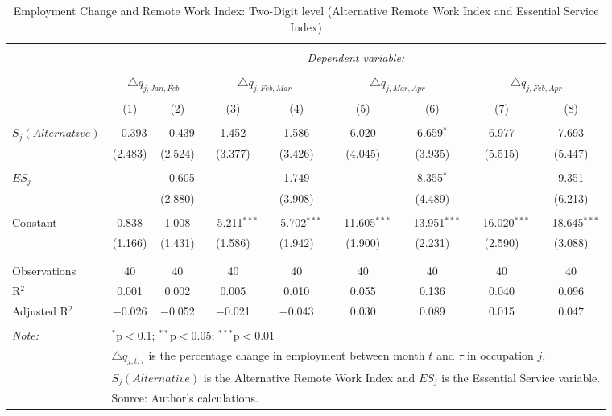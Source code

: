 
\begin{table}[!htbp] \centering 
  \caption{Employment Change and Remote Work Index: Two-Digit level (Alternative Remote Work Index and Essential Service Index)} 
  \label{tab:regression_dynamics_2digit_alternative_robustness_essential_service} 
\footnotesize 
\begin{tabular}{@{\extracolsep{5pt}}lcccccccc} 
\\[-1.8ex]\hline 
\hline \\[-1.8ex] 
 & \multicolumn{8}{c}{\textit{Dependent variable:}} \\ 
\cline{2-9} 
\\[-1.8ex] & \multicolumn{2}{c}{$\triangle q_{j,Jan,Feb}$} & \multicolumn{2}{c}{$\triangle q_{j,Feb,Mar}$} & \multicolumn{2}{c}{$\triangle q_{j,Mar,Apr}$} & \multicolumn{2}{c}{$\triangle q_{j,Feb,Apr}$} \\ 
\\[-1.8ex] & (1) & (2) & (3) & (4) & (5) & (6) & (7) & (8)\\ 
\hline \\[-1.8ex] 
 $S_{j} (Alternative)$ & $-$0.393 & $-$0.439 & 1.452 & 1.586 & 6.020 & 6.659$^{*}$ & 6.977 & 7.693 \\ 
  & (2.483) & (2.524) & (3.377) & (3.426) & (4.045) & (3.935) & (5.515) & (5.447) \\ 
  & & & & & & & & \\ 
 $ES_{j}$ &  & $-$0.605 &  & 1.749 &  & 8.355$^{*}$ &  & 9.351 \\ 
  &  & (2.880) &  & (3.908) &  & (4.489) &  & (6.213) \\ 
  & & & & & & & & \\ 
 Constant & 0.838 & 1.008 & $-$5.211$^{***}$ & $-$5.702$^{***}$ & $-$11.605$^{***}$ & $-$13.951$^{***}$ & $-$16.020$^{***}$ & $-$18.645$^{***}$ \\ 
  & (1.166) & (1.431) & (1.586) & (1.942) & (1.900) & (2.231) & (2.590) & (3.088) \\ 
  & & & & & & & & \\ 
\hline \\[-1.8ex] 
Observations & 40 & 40 & 40 & 40 & 40 & 40 & 40 & 40 \\ 
R$^{2}$ & 0.001 & 0.002 & 0.005 & 0.010 & 0.055 & 0.136 & 0.040 & 0.096 \\ 
Adjusted R$^{2}$ & $-$0.026 & $-$0.052 & $-$0.021 & $-$0.043 & 0.030 & 0.089 & 0.015 & 0.047 \\ 
\hline 
\hline \\[-1.8ex] 
\textit{Note:}  & \multicolumn{8}{l}{$^{*}$p$<$0.1; $^{**}$p$<$0.05; $^{***}$p$<$0.01} \\ 
 & \multicolumn{8}{l}{$\triangle q_{j,t,\tau}$ is the percentage change in employment between month $t$ and $\tau$ in occupation $j$,} \\ 
 & \multicolumn{8}{l}{$S_{j} (Alternative)$ is the Alternative Remote Work Index and $ES_{j}$ is the Essential Service variable.} \\ 
 & \multicolumn{8}{l}{Source: Author's calculations.} \\ 
\end{tabular} 
\end{table} 
